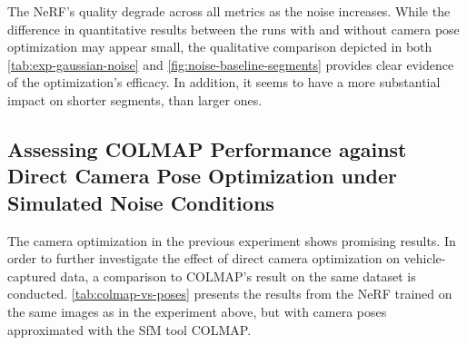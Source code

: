 \begin{comment}
4 & $\mathcal{N}(0, 0.5^2)$ & 20.071671 & 0.513037 & 0.299472 \\
5 & $\mathcal{N}(0, 1.0^2)$ & 18.290358 & 0.417969 & 0.404933 \\
6 & $\mathcal{N}(0, 3.0^2)$ & \cellcolor{red} 15.077240 & \cellcolor{red} 0.362973 & \cellcolor{green} 0.698665 \\
\hline
\end{tabular}
\caption{Results for Gaussian Noise experiment on shorter segments. The segments are 10\% the size of the baseline segment, approximately 50m in length.}
\label{tab:exp_gaussian_noise_short_segments}
\end{table}
\end{comment}




The NeRF's quality degrade across all metrics as the noise increases. While the difference in quantitative results between the runs with and without camera pose optimization may appear small, the qualitative comparison depicted in both \autoref{tab:exp-gaussian-noise} and \autoref{fig:noise-baseline-segments} provides clear evidence of the optimization's efficacy. In addition, it seems to have a more substantial impact on shorter segments, than larger ones.

\begin{comment}
Information about GNSS-error
https://junipersys.com/support/article/6614#:~:text=Just%
\end{comment}



\subsection{Assessing COLMAP Performance against Direct Camera Pose Optimization under Simulated Noise Conditions}

The camera optimization in the previous experiment shows promising results. In order to further investigate the effect of direct camera optimization on vehicle-captured data, a comparison to COLMAP's result on the same dataset is conducted. \autoref{tab:colmap-vs-poses} presents the results from the NeRF trained on the same images as in the experiment above, but with camera poses approximated with the SfM tool COLMAP.

